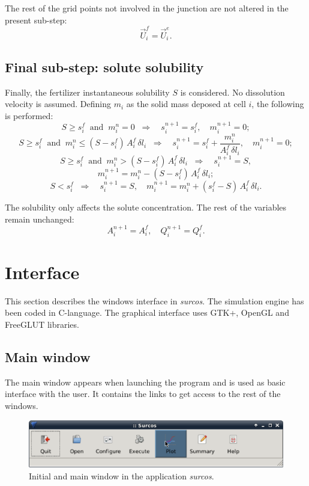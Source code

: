 \documentclass[review,authoryear]{elsarticle}
\newcommand{\eq}[2]{\begin{equation}\label{#2}#1\end{equation}}
\newcommand{\PA}[1] {\left(#1\right)}
\begin{document}
The rest of the grid points not involved in the junction are not altered in the
present sub-step:
\eq{\vec{U}_i^f=\vec{U}_i^e.}{EqJunctionPoint}

\subsection{Final sub-step: solute solubility}

Finally, the fertilizer instantaneous solubility $S$ is considered. No
dissolution velocity is assumed. Defining $m_i$ as the solid mass deposed at
cell $i$, the following is performed:
\[
	S\geq s_i^f\;\;\mathrm{and}\;\;m_i^n=0\;\;\Rightarrow\quad
	s_i^{n+1}=s_i^f,\quad m_i^{n+1}=0;
\]
\[
	S\geq s_i^f\;\;\mathrm{and}\;\;m_i^n\leq\PA{S-s_i^f}\,A_i^f\,\delta l_i\;\;
	\Rightarrow\quad
	s_i^{n+1}=s_i^f+\frac{m_i^n}{A_i^f\,\delta l_i},\quad m_i^{n+1}=0;
\]
\[
	S\geq s_i^f\;\;\mathrm{and}\;\;m_i^n>\PA{S-s_i^f}\,A_i^f\,\delta l_i\;\;
	\Rightarrow\quad s_i^{n+1}=S,
\]
\[m_i^{n+1}=m_i^n-\PA{S-s_i^f}\,A_i^f\,\delta l_i;\]
\eq
{
	S<s_i^f\;\;\Rightarrow\quad
	s_i^{n+1}=S,\quad m_i^{n+1}=m_i^n+\PA{s_i^f-S}\,A_i^f\,\delta l_i.
}{EqSolubility}

The solubility only affects the solute concentration. The rest of the variables
remain unchanged:
\eq{A_i^{n+1}=A_i^f,\quad Q_i^{n+1}=Q_i^f.}{EqSolubilityPoint}

\section{Interface}

This section describes the windows interface in \emph{surcos}. The simulation
engine has been coded in C-language. The graphical interface uses GTK+, OpenGL
and FreeGLUT libraries.

\subsection{Main window}

The main window appears when launching the program and is used as basic
interface with the user. It contains the links to get access to the rest of the
windows.

\newlength{\UNIT}
\setlength{\UNIT}{0.0107cm}

\begin{figure}[!ht]
\begin{center}
\includegraphics[width=642\UNIT]{mprincipalEN.eps}
\caption{Initial and main window in the application \emph{surcos}.}
	\label{mainWindow}
\end{center}
\end{figure}
\end{document}
